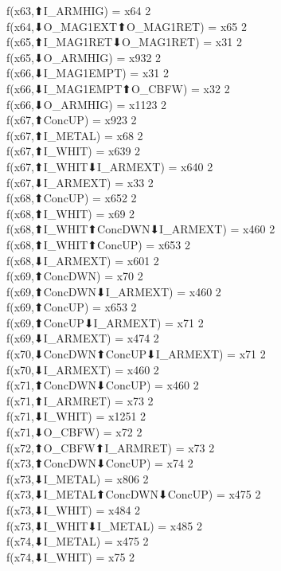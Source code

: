 f(x63,⬆I_ARMHIG) = x64 {2} \\
f(x64,⬇O_MAG1EXT⬆O_MAG1RET) = x65 {2} \\
f(x65,⬆I_MAG1RET⬇O_MAG1RET) = x31 {2} \\
f(x65,⬇O_ARMHIG) = x932 {2} \\
f(x66,⬇I_MAG1EMPT) = x31 {2} \\
f(x66,⬇I_MAG1EMPT⬆O_CBFW) = x32 {2} \\
f(x66,⬇O_ARMHIG) = x1123 {2} \\
f(x67,⬆ConcUP) = x923 {2} \\
f(x67,⬆I_METAL) = x68 {2} \\
f(x67,⬆I_WHIT) = x639 {2} \\
f(x67,⬆I_WHIT⬇I_ARMEXT) = x640 {2} \\
f(x67,⬇I_ARMEXT) = x33 {2} \\
f(x68,⬆ConcUP) = x652 {2} \\
f(x68,⬆I_WHIT) = x69 {2} \\
f(x68,⬆I_WHIT⬆ConcDWN⬇I_ARMEXT) = x460 {2} \\
f(x68,⬆I_WHIT⬆ConcUP) = x653 {2} \\
f(x68,⬇I_ARMEXT) = x601 {2} \\
f(x69,⬆ConcDWN) = x70 {2} \\
f(x69,⬆ConcDWN⬇I_ARMEXT) = x460 {2} \\
f(x69,⬆ConcUP) = x653 {2} \\
f(x69,⬆ConcUP⬇I_ARMEXT) = x71 {2} \\
f(x69,⬇I_ARMEXT) = x474 {2} \\
f(x70,⬇ConcDWN⬆ConcUP⬇I_ARMEXT) = x71 {2} \\
f(x70,⬇I_ARMEXT) = x460 {2} \\
f(x71,⬆ConcDWN⬇ConcUP) = x460 {2} \\
f(x71,⬆I_ARMRET) = x73 {2} \\
f(x71,⬇I_WHIT) = x1251 {2} \\
f(x71,⬇O_CBFW) = x72 {2} \\
f(x72,⬆O_CBFW⬆I_ARMRET) = x73 {2} \\
f(x73,⬆ConcDWN⬇ConcUP) = x74 {2} \\
f(x73,⬇I_METAL) = x806 {2} \\
f(x73,⬇I_METAL⬆ConcDWN⬇ConcUP) = x475 {2} \\
f(x73,⬇I_WHIT) = x484 {2} \\
f(x73,⬇I_WHIT⬇I_METAL) = x485 {2} \\
f(x74,⬇I_METAL) = x475 {2} \\
f(x74,⬇I_WHIT) = x75 {2} \\
